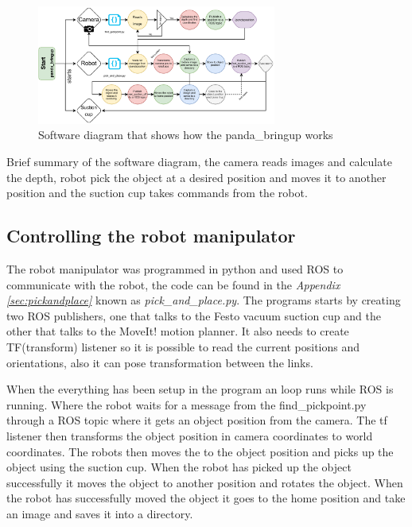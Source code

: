 \begin{figure}[h]
    \centering
    \includegraphics[width=0.7\textwidth]{graphics/softwareDiagram.pdf}
    \caption{Software diagram that shows how the panda\_bringup works}
    \label{fig:softwarediagram}
\end{figure}

Brief summary of the software diagram, the camera reads images and calculate the depth, robot pick the object at a desired position and moves it to another position and the suction cup takes commands from the robot.

\subsection{Controlling the robot manipulator}\label{robotcontrol}
The robot manipulator was programmed in python and used ROS to communicate with the robot, the code can be found in the \textit{Appendix \ref{sec:pickandplace}} known as \textit{pick\_and\_place.py}. 
The programs starts by creating two ROS publishers, one that talks to the Festo vacuum suction cup and the other that talks to the MoveIt! motion planner. 
It also needs to create TF(transform) listener so it is possible to read the current positions and orientations, also it can pose transformation between the links. 

When the everything has been setup in the program an loop runs while ROS is running. 
Where the robot waits for a message from the find\_pickpoint.py through a ROS topic where it gets an object position from the camera.
The tf listener then transforms the object position in camera coordinates to world coordinates. The robots then moves the to the object position and picks up the object using the suction cup. When the robot has picked up the object successfully it moves the object to another position and rotates the object. When the robot has successfully moved the object it goes to the home position and take an image and saves it into a directory. 

